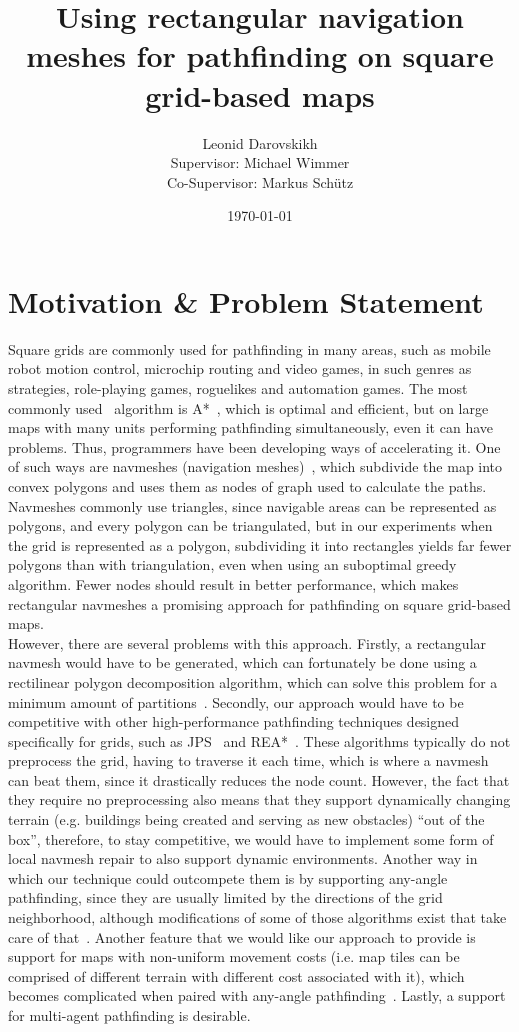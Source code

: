 \documentclass{article}
\title{Using rectangular navigation meshes for pathfinding on square grid-based maps}
\author{Leonid Darovskikh \\
	\small Supervisor: Michael Wimmer \\
	\small Co-Supervisor: Markus Sch\"utz
}
\date{\today}
\begin{document}
\maketitle

\section{Motivation \& Problem Statement}
Square grids are commonly used for pathfinding in many areas, such as mobile robot motion control, microchip routing and video games, in such genres as strategies, role-playing games, roguelikes and automation games. The most commonly used~\cite{cui2011based} algorithm is A*~\cite{hart1968formal}, which is optimal and efficient, but on large maps with many units performing pathfinding simultaneously, even it can have problems. Thus, programmers have been developing ways of accelerating it. One of such ways are navmeshes (navigation meshes)~\cite{snook2000simplified}, which subdivide the map into convex polygons and uses them as nodes of graph used to calculate the paths. Navmeshes commonly use triangles, since navigable areas can be represented as polygons, and every polygon can be triangulated, but in our experiments when the grid is represented as a polygon, subdividing it into rectangles yields far fewer polygons than with triangulation, even when using an suboptimal greedy algorithm. Fewer nodes should result in better performance, which makes rectangular navmeshes a promising approach for pathfinding on square grid-based maps. \\

However, there are several problems with this approach. Firstly, a rectangular navmesh would have to be generated, which can fortunately be done using a rectilinear polygon decomposition algorithm, which can solve this problem for a minimum amount of partitions~\cite{eppstein2009graph}. Secondly, our approach would have to be competitive with other high-performance pathfinding techniques designed specifically for grids, such as JPS~\cite{harabor2011online} and REA*~\cite{zhang2016rectangle}. These algorithms typically do not preprocess the grid, having to traverse it each time, which is where a navmesh can beat them, since it drastically reduces the node count. However, the fact that they require no preprocessing also means that they support dynamically changing terrain (e.g. buildings being created and serving as new obstacles) ``out of the box'', therefore, to stay competitive, we would have to implement some form of local navmesh repair to also support dynamic environments. Another way in which our technique could outcompete them is by supporting any-angle pathfinding, since they are usually limited by the directions of the grid neighborhood, although modifications of some of those algorithms exist that take care of that~\cite{luo2022improved}. Another feature that we would like our approach to provide is support for maps with non-uniform movement costs (i.e. map tiles can be comprised of different terrain with different cost associated with it), which becomes complicated when paired with any-angle pathfinding~\cite{mitchell1991weighted}. Lastly, a support for multi-agent pathfinding is desirable. \\
\end{document}
